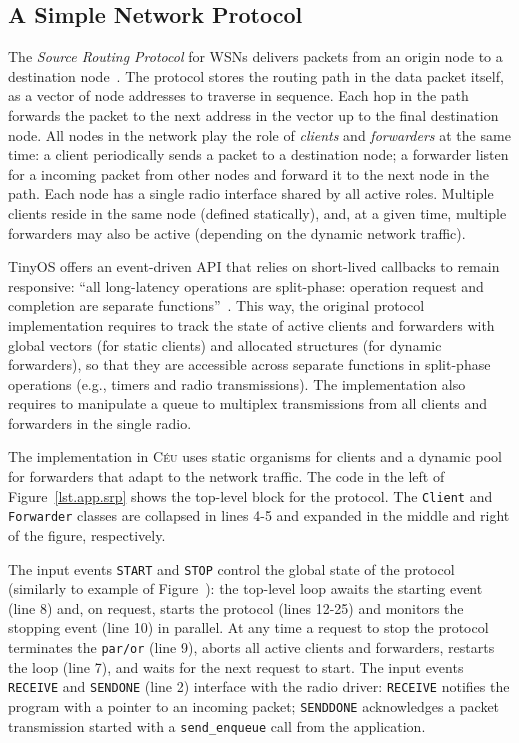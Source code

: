 \documentclass{sigplanconf}
\newcommand{\CEU}{\textsc{C\'{e}u}\xspace}
\newcommand{\code}[1] {{\small{\texttt{#1}}}}
\newcommand{\1}{\;}
\newcommand{\2}{\;\;}
\newcommand{\3}{\;\;\;}
\newcommand{\5}{\;\;\;\;\;}
\begin{document}
\subsection{A Simple Network Protocol}
\label{sec.apps.srp}

The \emph{Source Routing Protocol} for WSNs delivers packets from an origin 
node to a destination node~\cite{wsn.teps}.
The protocol stores the routing path in the data packet itself, as a vector of 
node addresses to traverse in sequence.
Each hop in the path forwards the packet to the next address in the vector up 
to the final destination node.
%
All nodes in the network play the role of \emph{clients} and \emph{forwarders} 
at the same time:
%
a client periodically sends a packet to a destination node;
a forwarder listen for a incoming packet from other nodes and forward it to the 
next node in the path.
%
Each node has a single radio interface shared by all active roles.
Multiple clients reside in the same node (defined statically), and, at a given 
time, multiple forwarders may also be active (depending on the dynamic network 
traffic).

TinyOS offers an event-driven API that relies on short-lived callbacks to 
remain responsive:
``all long-latency operations are split-phase: operation request and completion 
are separate functions''~\cite{wsn.nesc}.
This way, the original protocol implementation requires to track the state of 
active clients and forwarders with global vectors (for static clients) and 
allocated structures (for dynamic forwarders), so that they are accessible 
across separate functions in split-phase operations (e.g., timers and radio 
transmissions).
The implementation also requires to manipulate a queue to multiplex 
transmissions from all clients and forwarders in the single radio.

The implementation in \CEU uses static organisms for clients and a dynamic pool 
for forwarders that adapt to the network traffic.
%
The code in the left of Figure~\ref{lst.app.srp} shows the top-level block for 
the protocol.
The \code{Client} and \code{Forwarder} classes are collapsed in lines 4-5 and 
expanded in the middle and right of the figure, respectively.

The input events \code{START} and \code{STOP} control the global state of the 
protocol (similarly to example of Figure~\label{lst.ctp}):
the top-level loop awaits the starting event (line 8) and, on request, starts 
the protocol (lines 12-25) and monitors the stopping event (line 10) in 
parallel.
%
At any time a request to stop the protocol terminates the \code{par/or} (line 
9), aborts all active clients and forwarders, restarts the loop (line 7), and 
waits for the next request to start.
%
The input events \code{RECEIVE} and \code{SENDONE} (line 2) interface with the 
radio driver:
\code{RECEIVE} notifies the program with a pointer to an incoming packet;
\code{SENDDONE} acknowledges a packet transmission started with a 
\code{send\_enqueue} call from the application.
\end{document}

